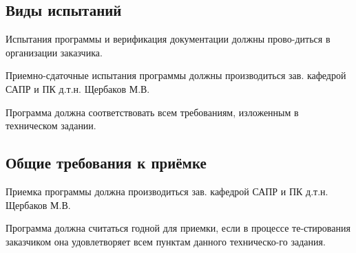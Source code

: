 \documentclass[14pt]{extarticle}        %
\begin{document}
\subsection {Виды испытаний}
Испытания программы и верификация документации должны прово-диться в организации заказчика.\par
Приемно-сдаточные испытания программы должны производиться зав. кафедрой САПР и ПК д.т.н. Щербаков М.В.\par
Программа должна соответствовать всем требованиям, изложенным в техническом задании.
\subsection {Общие требования к приёмке}
Приемка программы должна производиться зав. кафедрой САПР и ПК
д.т.н. Щербаков М.В.\par
Программа должна считаться годной для приемки, если в процессе те-стирования заказчиком она удовлетворяет всем пунктам данного техническо-го задания.

\label{sec:purpose}
\end{document}
